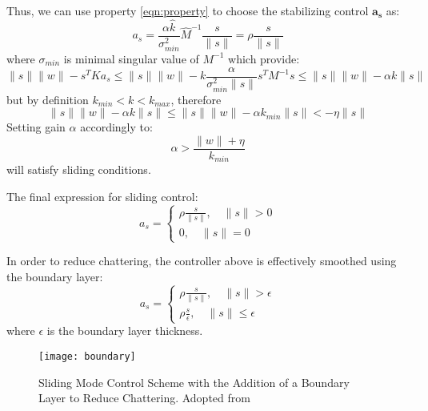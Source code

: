     Thus, we can use property \ref*{eqn:property} to choose the stabilizing control 
    $\mathbf{a_s}$ as:
    \begin{equation}
        a_s = \frac{\alpha \hat{k}}{\sigma_{min}^2}\hat{M}^{-1}\frac{s}{\|s\|} = 
        \rho \frac{s}{\|s\|} 
    \end{equation}
    where $\sigma_{min}$ is minimal singular value of $M^{-1}$
    which provide:
    \begin{equation}
        \|s\|\|w\| - s^TKa_s \leq 
        \|s\|\|w\| - k \frac{\alpha}{\sigma^2_{min}\|s\|}s^TM^{-1}s \leq 
        \|s\|\|w\| - \alpha k \|s\|
    \end{equation}
    but by definition $k_{min} < k < k_{max}$, therefore
    \begin{equation}
        \|s\|\|w\| - \alpha k \|s\| \leq
        \|s\|\|w\| - \alpha k_{min} \|s\| < - \eta \|s\|
    \end{equation}
    Setting gain $\alpha$ accordingly to:
    \begin{equation}
    \alpha > \frac{\|w\| + \eta}{k_{min}}
    \end{equation}
    will satisfy sliding conditions.

    The final expression for sliding control:
    \begin{equation}   
    a_s = 
    \begin{cases}
    \rho \frac{s}{\|s\|}, \quad \|s\| > 0\\
    0, \quad \|s\| = 0 
    \end{cases}
    \end{equation}

    In order to reduce chattering, the controller above is effectively smoothed using
    the boundary layer:
    \begin{equation}
    a_s = 
    \begin{cases}
    \rho \frac{s}{\|s\|}, \quad \|s\| >\epsilon\\
    \rho \frac{s}{\epsilon}, \quad \|s\| \leq\epsilon
    \end{cases}
    \end{equation}
    where $\epsilon$ is the boundary layer thickness.

    \begin{figure}[H]
        \centering\texttt{[image: boundary]}
        \caption{Sliding Mode Control Scheme with the Addition of a Boundary Layer to Reduce Chattering. Adopted from \cite{boundary}}
        \label{image:boundary}
    \end{figure}

